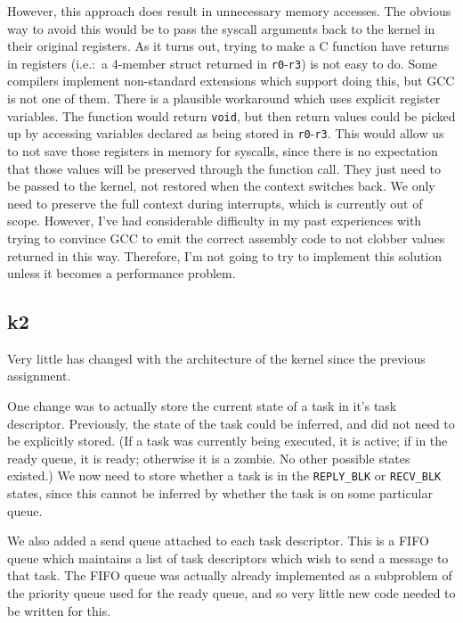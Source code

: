 \documentclass[titlepage]{article}
\begin{document}
However, this approach does result in unnecessary memory accesses.
The obvious way to avoid this would be to pass the syscall arguments back to the kernel
in their original registers.
As it turns out, trying to make a C function have returns in registers (i.e.:\ a 4-member
struct returned in \texttt{r0}-\texttt{r3}) is not easy to do.
Some compilers implement non-standard extensions which support doing this, but GCC
is not one of them.
There is a plausible workaround which uses explicit register variables.
The function would return \texttt{void}, but then return values could be picked up
by accessing variables declared as being stored in \texttt{r0}-\texttt{r3}.
This would allow us to not save those registers in memory for syscalls, since
there is no expectation that those values will be preserved through the function call.
They just need to be passed to the kernel, not restored when the context switches back.
We only need to preserve the full context during interrupts, which is
currently out of scope.
However, I've had considerable difficulty in my past experiences with trying to
convince GCC to emit the correct assembly code to not clobber values returned in this
way.
Therefore, I'm not going to try to implement this solution unless it becomes a
performance problem.

\subsection{k2} %
Very little has changed with the architecture of the kernel since the previous assignment.

One change was to actually store the current state of a task in it's task descriptor.
Previously, the state of the task could be inferred, and did not need to be explicitly stored.
(If a task was currently being executed, it is active; if in the ready queue, it is ready; otherwise
it is a zombie. No other possible states existed.)
We now need to store whether a task is in the \texttt{REPLY\_BLK} or \texttt{RECV\_BLK} states,
since this cannot be inferred by whether the task is on some particular queue.

We also added a send queue attached to each task descriptor.
This is a FIFO queue which maintains a list of task descriptors which wish to send a message
to that task.
The FIFO queue was actually already implemented as a subproblem of the priority queue used
for the ready queue, and so very little new code needed to be written for this.
\end{document}
